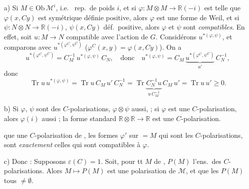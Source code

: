 \documentclass[11pt,a4paper]{article}
\begin{document}
a) Si $M \in \mathrm{Ob}\,\mathcal{M}^{i}$, i.e.\  rep.\ de 
poids $i$, et si $\varphi \colon M \otimes M \to \mathbb{R}(-i)$ est
telle que $\varphi(x, Cy)$ est symétrique définie
positive, alors $\varphi$ est une forme de Weil, et si  $\psi \colon N \otimes N
\to \mathbb{R}(-i)$, $\psi(x, Cy)$ déf.\ positive, alors $\varphi$ et $\psi$
sont \emph{compatibles}.
En effet, soit $u \colon M \to N$ compatible avec l'action de $G$.
Considérons $u^{*(\varphi,\psi)}$, et comparons avec
$u^{*(\varphi^{C},\psi^{C})}$ ($\varphi^{C}(x,y) = \varphi(x, Cy)$). On a
\[
u^{*(\varphi^{C},\psi^{C})} = C_M^{-1}\, u^{*(\varphi,\psi)}\, C_N,
\quad\text{donc}\quad
u^{*(\varphi,\psi)} = C_M\, \underbrace{u^{*(\varphi^{C},\psi^{C})}}_{u'}\, C_N^{-1},
\]
donc
\[
\operatorname{Tr} u\, u^{*(\varphi,\psi)}
= \operatorname{Tr} u\, C_M\, u'\, C_N^{-1}
= \operatorname{Tr} \underbrace{C_N^{-1} u}_{u\, C_M^{-1}}\, C_M\, u'
= \operatorname{Tr} u\, u' \geqslant 0.
\]
\struck{\ill{}}

b) Si $\varphi$, $\psi$ sont des $C$-polarisations, $\varphi \otimes \psi$
aussi,  ; si $\varphi$
est une $C$-polarisation, alors $\varphi(i)$ aussi ; la forme standard
$\mathbb{R} \otimes \mathbb{R} \to \mathbb{R}$ est une $C$-polarisation.

\ill{} que une $C$-polarisation de \ill{}, les formes $\varphi'$ sur \ill{}
$= M$ qui sont les $C$-polarisations, sont \emph{exactement} celles qui sont
compatibles à $\varphi$.

c) Donc : Supposons $\varepsilon(C) = 1$. Soit, pour tt $M$ de , $P(M)$ l'ens.\ des $C$-polarisations. Alors $M \mapsto P(M)$ est une
polarisation de $\mathcal{M}$, et  que les $P(M)$
 tous $\neq \emptyset$.
\end{document}
